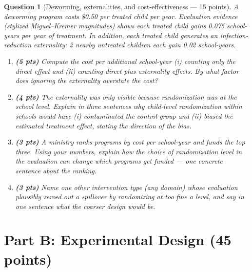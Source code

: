 \documentclass[11pt]{article}
\newtheorem{question}{Question}
\begin{document}
\begin{question}[Deworming, externalities, and cost-effectiveness --- 15
points]
A deworming program costs \$0.50 per treated child per year. Evaluation
evidence (stylized Miguel--Kremer magnitudes) shows each treated child
gains 0.075 school-years per year of treatment. In addition, each
treated child generates an infection-reduction externality: 2 nearby
untreated children each gain 0.02 school-years.

\begin{enumerate}[label=(\alph*)]
  \item \textbf{(5 pts)} Compute the cost per additional school-year
        (i) counting only the direct effect and (ii) counting direct
        plus externality effects. By what factor does ignoring the
        externality overstate the cost?
  \item \textbf{(4 pts)} The externality was only visible because
        randomization was at the \emph{school} level. Explain in three
        sentences why child-level randomization within schools would
        have (i) contaminated the control group and (ii) biased the
        estimated treatment effect, stating the direction of the bias.
  \item \textbf{(3 pts)} A ministry ranks programs by cost per
        school-year and funds the top three. Using your numbers,
        explain how the choice of randomization level in the
        \emph{evaluation} can change which programs get \emph{funded}
        --- one concrete sentence about the ranking.
  \item \textbf{(3 pts)} Name one other intervention type (any domain)
        whose evaluation plausibly zeroed out a spillover by
        randomizing at too fine a level, and say in one sentence what
        the coarser design would be.
\end{enumerate}
\end{question}

\section*{Part B: Experimental Design (45 points)}
\end{document}
